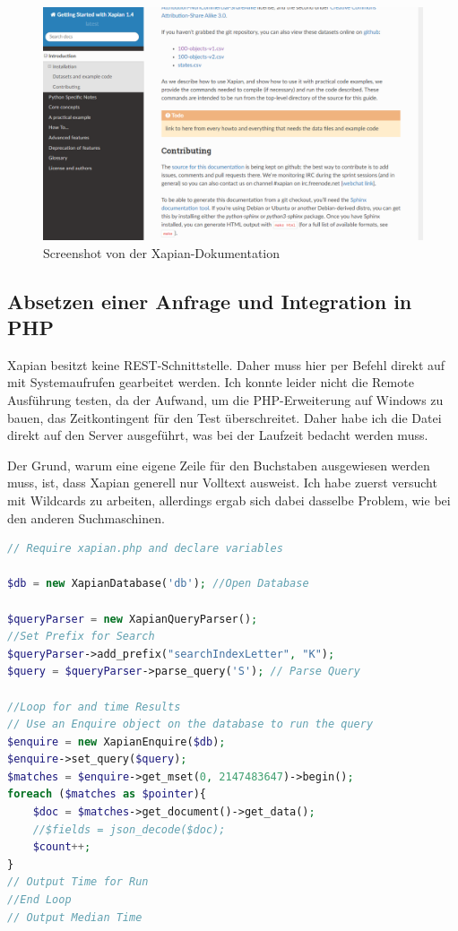 \begin{figure}
	\centering
	\includegraphics[width=1\linewidth]{images/xapian_doku.png}
	\caption{Screenshot von der Xapian-Dokumentation}
	\label{img:xapianDoku}
\end{figure}

\subsection{Absetzen einer Anfrage und Integration in PHP}

Xapian besitzt keine REST-Schnittstelle. Daher muss hier per Befehl direkt auf mit Systemaufrufen gearbeitet werden. Ich konnte leider nicht die Remote Ausführung testen, da der Aufwand, um die PHP-Erweiterung auf Windows zu bauen, das Zeitkontingent für den Test überschreitet. Daher habe ich die Datei direkt auf den Server ausgeführt, was bei der Laufzeit bedacht werden muss. 

Der Grund, warum eine eigene Zeile für den Buchstaben ausgewiesen werden muss, ist, dass Xapian generell nur Volltext ausweist. Ich habe zuerst versucht mit Wildcards zu arbeiten, allerdings ergab sich dabei dasselbe Problem, wie bei den anderen Suchmaschinen.

\begin{lstlisting}[language=php, frame=single, label={lst:XapPhpQuery}, 
	morekeywords={type,uninvertible,indexed,stored,field,multiValued, name}] 
// Require xapian.php and declare variables

$db = new XapianDatabase('db'); //Open Database

$queryParser = new XapianQueryParser();
//Set Prefix for Search
$queryParser->add_prefix("searchIndexLetter", "K"); 
$query = $queryParser->parse_query('S'); // Parse Query

//Loop for and time Results
// Use an Enquire object on the database to run the query
$enquire = new XapianEnquire($db);
$enquire->set_query($query);
$matches = $enquire->get_mset(0, 2147483647)->begin();
foreach ($matches as $pointer){
	$doc = $matches->get_document()->get_data();
	//$fields = json_decode($doc);
	$count++;
}
// Output Time for Run
//End Loop 
// Output Median Time
	
\end{lstlisting}


